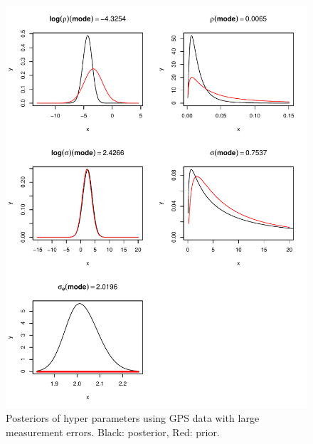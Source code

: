 \documentclass[a4paper,12pt]{article}
\begin{document}
\begin{figure}[htbp]
 \begin{center}
 \includegraphics[scale = 0.8]{fig/sMesh_LErr_hyperpar.pdf}
 \end{center}
 \caption[Hyper parameter with large errors]{Posteriors of hyper parameters using GPS data with large measurement errors. Black: posterior, Red: prior.}
 \label{fig:2}
 \end{figure}
 
\end{document}

